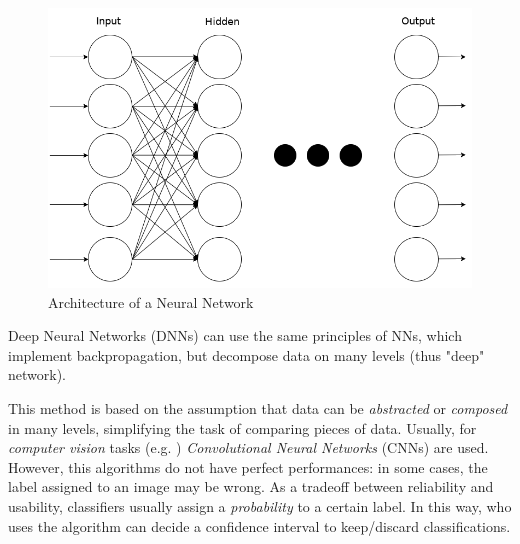 \begin{figure}[htpb]
\centering
    \includegraphics[scale=0.28]{../img/nn}
    \caption{Architecture of a Neural Network}
    \label{fig:nn}
\end{figure}

Deep Neural Networks (DNNs) can use the same principles of NNs, which implement backpropagation, but decompose data on many levels (thus "deep" network).

This method is based on the assumption that data can be \textit{abstracted} or \textit{composed} in many levels, simplifying the task of comparing pieces of data.
Usually, for \textit{computer vision} tasks (e.g. \cite{Handwritten}) \textit{Convolutional Neural Networks} (CNNs) are used\cite{CNN}.
However, this algorithms do not have perfect performances: in some cases, the label assigned to an image may be wrong. As a tradeoff between reliability and usability, classifiers usually assign a \textit{probability} to a certain label. In this way, who uses the algorithm can decide a confidence interval to keep/discard classifications. 